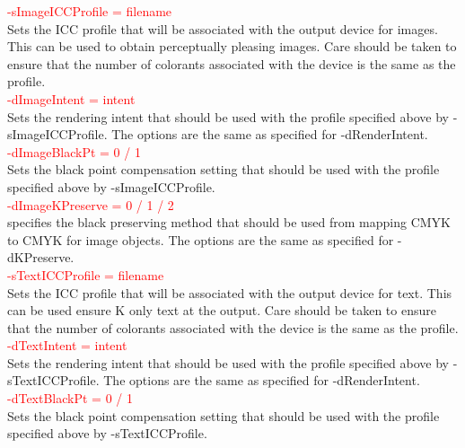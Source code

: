\documentclass[12pt,notitlepage]{article}
\begin{document}
\textcolor{red}{-sImageICCProfile = filename}\\

\noindent Sets the ICC profile that will be associated with the output device for images.  This can be used to obtain perceptually pleasing images.
Care should be taken to ensure that the number of colorants associated with the device is the same as the profile. \\

\textcolor{red}{-dImageIntent = intent}\\

\noindent Sets the rendering intent that should be used with the profile specified above by -sImageICCProfile. The options are the same as specified for -dRenderIntent. \\

\textcolor{red}{-dImageBlackPt = 0 / 1}\\

\noindent Sets the black point compensation setting that should be used with the profile specified above by -sImageICCProfile.\\

\textcolor{red}{-dImageKPreserve = 0 / 1 / 2}\\

\noindent specifies the black preserving method that should be used from mapping CMYK to CMYK for image objects.   The
options are the same as specified for -dKPreserve.\\

\textcolor{red}{-sTextICCProfile = filename}\\

\noindent Sets the ICC profile that will be associated with the output device for text.  This can be used ensure K only text at the output. Care should be taken to ensure that the number of colorants associated with the device is the same as the profile.\\

\textcolor{red}{-dTextIntent = intent}\\

\noindent Sets the rendering intent that should be used with the profile specified above by -sTextICCProfile. The options are the same as specified for -dRenderIntent. \\

\textcolor{red}{-dTextBlackPt = 0 / 1}\\

\noindent Sets the black point compensation setting that should be used with the profile specified above by -sTextICCProfile.\\
\end{document}
